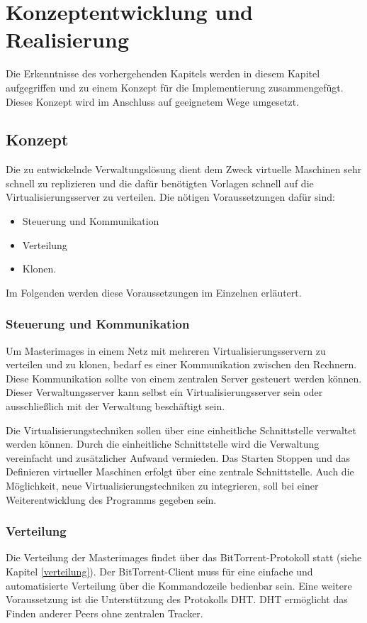 \chapter{Konzeptentwicklung und Realisierung}
Die Erkenntnisse des vorhergehenden Kapitels werden in diesem Kapitel aufgegriffen und zu einem Konzept für die Implementierung zusammengefügt. Dieses Konzept wird im Anschluss auf geeignetem Wege umgesetzt.
\section{Konzept}
Die zu entwickelnde Verwaltungslösung dient dem Zweck virtuelle Maschinen sehr schnell zu replizieren und die dafür benötigten Vorlagen schnell auf die Virtualisierungsserver zu verteilen. Die nötigen Voraussetzungen dafür sind:
\begin{itemize}
\item{Steuerung und Kommunikation}
\item{Verteilung}
\item{Klonen.}
\end{itemize}
Im Folgenden werden diese Voraussetzungen im Einzelnen erläutert.

\subsection{Steuerung und Kommunikation}
Um Masterimages in einem Netz mit mehreren Virtualisierungsservern zu verteilen und zu klonen, bedarf es einer Kommunikation zwischen den Rechnern. Diese Kommunikation sollte von einem zentralen Server gesteuert werden können. Dieser Verwaltungsserver kann selbst ein Virtualisierungsserver sein oder ausschließlich mit der Verwaltung beschäftigt sein.

Die Virtualisierungstechniken sollen über eine einheitliche Schnittstelle verwaltet werden können. Durch die einheitliche Schnittstelle wird die Verwaltung vereinfacht und zusätzlicher Aufwand vermieden. Das Starten Stoppen und das Definieren virtueller Maschinen erfolgt über eine zentrale Schnittstelle. Auch die Möglichkeit, neue Virtualisierungstechniken zu integrieren, soll bei einer Weiterentwicklung des Programms gegeben sein.

\subsection{Verteilung}
Die Verteilung der Masterimages findet über das BitTorrent-Protokoll statt (siehe Kapitel \ref{verteilung}). Der BitTorrent-Client muss für eine einfache und automatisierte Verteilung über die Kommandozeile bedienbar sein. Eine weitere Voraussetzung ist die Unterstützung des Protokolls DHT. DHT ermöglicht das Finden anderer Peers ohne zentralen Tracker. %

